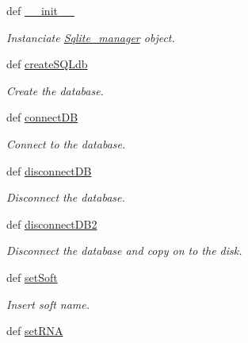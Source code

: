 \begin{DoxyCompactItemize}
\item 
def \hyperlink{classirna_1_1iRNA__pred_1_1Sqlite__manager_1_1Sqlite__manager_a0626c7c5d29ac000f76cc2bac969fcf7}{\-\_\-\-\_\-init\-\_\-\-\_\-}
\begin{DoxyCompactList}\small\item\em \-Instanciate \hyperlink{classirna_1_1iRNA__pred_1_1Sqlite__manager_1_1Sqlite__manager}{\-Sqlite\-\_\-manager} object. \end{DoxyCompactList}\item 
def \hyperlink{classirna_1_1iRNA__pred_1_1Sqlite__manager_1_1Sqlite__manager_a9c02981f33d88fab7686f779e5c73d3a}{create\-S\-Q\-Ldb}
\begin{DoxyCompactList}\small\item\em \-Create the database. \end{DoxyCompactList}\item 
def \hyperlink{classirna_1_1iRNA__pred_1_1Sqlite__manager_1_1Sqlite__manager_a28389195c38f5d98643cb9aa56eaa537}{connect\-D\-B}
\begin{DoxyCompactList}\small\item\em \-Connect to the database. \end{DoxyCompactList}\item 
def \hyperlink{classirna_1_1iRNA__pred_1_1Sqlite__manager_1_1Sqlite__manager_a6821f956aeea2d6b8ba4ab2d102465b5}{disconnect\-D\-B}
\begin{DoxyCompactList}\small\item\em \-Disconnect the database. \end{DoxyCompactList}\item 
def \hyperlink{classirna_1_1iRNA__pred_1_1Sqlite__manager_1_1Sqlite__manager_a4eba5f3b304c37b90dd6b8870c08f454}{disconnect\-D\-B2}
\begin{DoxyCompactList}\small\item\em \-Disconnect the database and copy on to the disk. \end{DoxyCompactList}\item 
def \hyperlink{classirna_1_1iRNA__pred_1_1Sqlite__manager_1_1Sqlite__manager_a50f7762786d30d3c900f895d88f515d3}{set\-Soft}
\begin{DoxyCompactList}\small\item\em \-Insert soft name. \end{DoxyCompactList}\item 
def \hyperlink{classirna_1_1iRNA__pred_1_1Sqlite__manager_1_1Sqlite__manager_a5bf16670032a84a8a6238420d0761e7e}{set\-R\-N\-A}

\end{DoxyCompactItemize}
